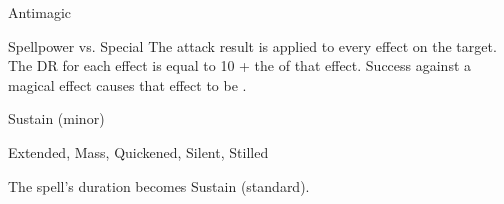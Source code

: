\begin{spellsection}{Antimagic}
\begin{spellcontent}
\begin{spelltargetinginfo}
\end{spelltargetinginfo}
\begin{spelleffects}
\begin{spellattack}{Spellpower vs. Special}
\spellspecial
The attack result is applied to every  effect on the target.
The DR for each effect is equal to 10 + the  of that effect.
\spellsuccess
Success against a magical effect causes that effect to be .
\end{spellattack}
\spelldur Sustain (minor)
\end{spelleffects}
\end{spellcontent}
\begin{spellfooter}
 Extended, Mass, Quickened, Silent, Stilled
\end{spellfooter}
\begin{spellsubcontent}
\begin{spellcantrip}
The spell's duration becomes Sustain (standard).
\end{spellcantrip}
\end{spellsubcontent}
\end{spellsection}
